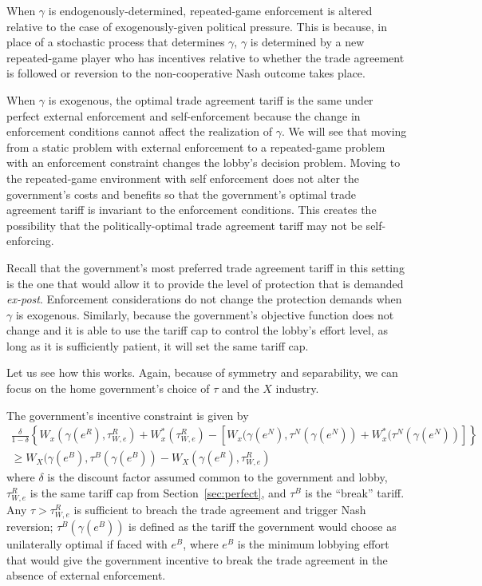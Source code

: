 \documentclass[12pt]{article}
\newcommand{\ga}{\gamma}
\newcommand{\de}{\delta}
\begin{document}
When $\ga$ is endogenously-determined, repeated-game enforcement is altered relative to the case of exogenously-given political pressure. This is because, in place of a stochastic process that determines $\ga$, $\ga$ is determined by a new repeated-game player who has incentives relative to whether the trade agreement is followed or reversion to the non-cooperative Nash outcome takes place.

When $\ga$ is exogenous, the optimal trade agreement tariff is the same under perfect external enforcement and self-enforcement because the change in enforcement conditions cannot affect the realization of $\ga$. We will see that moving from a static problem with external enforcement to a repeated-game problem with an enforcement constraint changes the lobby's decision problem. Moving to the repeated-game environment with self enforcement does not alter the government's costs and benefits so that the government's optimal trade agreement tariff is invariant to the enforcement conditions. This creates the possibility that the politically-optimal trade agreement tariff may not be self-enforcing.

Recall that the government's most preferred trade agreement tariff in this setting is the one that would allow it to provide the level of protection that is demanded \textit{ex-post}. Enforcement considerations do not change the protection demands when $\ga$ is exogenous. Similarly, because the government's objective function does not change and it is able to use the tariff cap to control the lobby's effort level, as long as it is sufficiently patient, it will set the same tariff cap.

Let us see how this works. Again, because of symmetry and separability, we can focus on the home government's choice of $\tau$ and the $X$ industry.

The government's incentive constraint is given by
  \begin{multline}
    \frac{\de}{1-\de} \left\{W_x(\ga(e^R),\tau^R_{W,e}) + W_x^*(\tau^R_{W,e}) - \left[W_x(\ga(e^N),\tau^N(\ga(e^N)) + W_x^*(\tau^N(\ga(e^N)) \right] \right\} \\ \geq W_X(\ga(e^B),\tau^B(\ga(e^B)) - W_X(\ga(e^R),\tau^R_{W,e})
		\label{exp:govincent}
  \end{multline}
where $\de$ is the discount factor assumed common to the government and lobby, $\tau^R_{W,e}$ is the same tariff cap from Section~\ref{sec:perfect}, and $\tau^B$ is the ``break'' tariff. Any $\tau > \tau^R_{W,e}$ is sufficient to breach the trade agreement and trigger Nash reversion; $\tau^B(\ga(e^B))$ is defined as the tariff the government would choose as unilaterally optimal if faced with $e^B$, where $e^B$ is the minimum lobbying effort that would give the government incentive to break the trade agreement in the absence of external enforcement.
\end{document}
